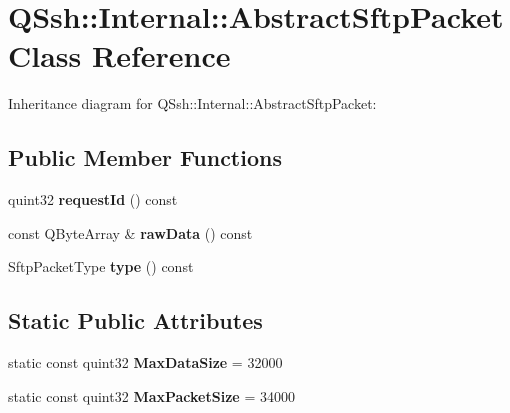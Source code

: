 \hypertarget{class_q_ssh_1_1_internal_1_1_abstract_sftp_packet}{}\section{Q\+Ssh\+:\+:Internal\+:\+:Abstract\+Sftp\+Packet Class Reference}
\label{class_q_ssh_1_1_internal_1_1_abstract_sftp_packet}


Inheritance diagram for Q\+Ssh\+:\+:Internal\+:\+:Abstract\+Sftp\+Packet\+:
\subsection*{Public Member Functions}
\begin{DoxyCompactItemize}
\item 
\mbox{\label{class_q_ssh_1_1_internal_1_1_abstract_sftp_packet_a504cbd3ef602f0d2cd347684971e282e}} 
quint32 {\bfseries request\+Id} () const
\item 
\mbox{\label{class_q_ssh_1_1_internal_1_1_abstract_sftp_packet_ad7c7f68624a44e967f739197685c5110}} 
const Q\+Byte\+Array \& {\bfseries raw\+Data} () const
\item 
\mbox{\label{class_q_ssh_1_1_internal_1_1_abstract_sftp_packet_ae329759384c91f3ee95b49e20f315f36}} 
Sftp\+Packet\+Type {\bfseries type} () const
\end{DoxyCompactItemize}
\subsection*{Static Public Attributes}
\begin{DoxyCompactItemize}
\item 
\mbox{\label{class_q_ssh_1_1_internal_1_1_abstract_sftp_packet_a79b08a0e10160d65a4192303478ff738}} 
static const quint32 {\bfseries Max\+Data\+Size} = 32000
\item 
\mbox{\label{class_q_ssh_1_1_internal_1_1_abstract_sftp_packet_aee44cb6199206c9f120dbc4aa50e30de}} 
static const quint32 {\bfseries Max\+Packet\+Size} = 34000
\end{DoxyCompactItemize}
